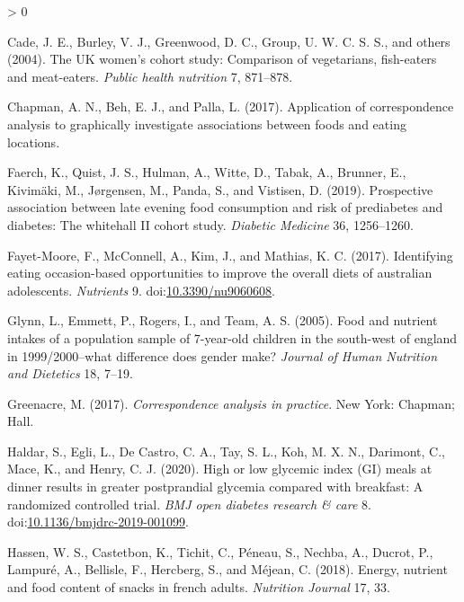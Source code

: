 \documentclass[utf8]{frontiersSCNS}
\newlength{\cslhangindent}
\newenvironment{CSLReferences}[2] %
 {%
  \setlength{\parindent}{0pt}
  \ifodd #1 \everypar{\setlength{\hangindent}{\cslhangindent}}\ignorespaces\fi
  \ifnum #2 > 0
  \setlength{\parskip}{#2\baselineskip}
  \fi
 }%
 {}
\begin{document}
\begin{CSLReferences}{1}{0}
\leavevmode\hypertarget{ref-cade2004uk}{}%
Cade, J. E., Burley, V. J., Greenwood, D. C., Group, U. W. C. S. S., and
others (2004). The UK women's cohort study: Comparison of vegetarians,
fish-eaters and meat-eaters. \emph{Public health nutrition} 7, 871--878.

\leavevmode\hypertarget{ref-Chapman2017}{}%
Chapman, A. N., Beh, E. J., and Palla, L. (2017). Application of
correspondence analysis to graphically investigate associations between
foods and eating locations.

\leavevmode\hypertarget{ref-faerch2019prospective}{}%
Faerch, K., Quist, J. S., Hulman, A., Witte, D., Tabak, A., Brunner, E.,
Kivimäki, M., Jørgensen, M., Panda, S., and Vistisen, D. (2019).
Prospective association between late evening food consumption and risk
of prediabetes and diabetes: The whitehall II cohort study.
\emph{Diabetic Medicine} 36, 1256--1260.

\leavevmode\hypertarget{ref-FayetMoore2017}{}%
Fayet-Moore, F., McConnell, A., Kim, J., and Mathias, K. C. (2017).
Identifying eating occasion-based opportunities to improve the overall
diets of australian adolescents. \emph{Nutrients} 9.
doi:\href{https://doi.org/10.3390/nu9060608}{10.3390/nu9060608}.

\leavevmode\hypertarget{ref-glynn2005food}{}%
Glynn, L., Emmett, P., Rogers, I., and Team, A. S. (2005). Food and
nutrient intakes of a population sample of 7-year-old children in the
south-west of england in 1999/2000--what difference does gender make?
\emph{Journal of Human Nutrition and Dietetics} 18, 7--19.

\leavevmode\hypertarget{ref-greenacre2017correspondence}{}%
Greenacre, M. (2017). \emph{Correspondence analysis in practice}. New
York: Chapman; Hall.

\leavevmode\hypertarget{ref-Haldar2020}{}%
Haldar, S., Egli, L., De Castro, C. A., Tay, S. L., Koh, M. X. N.,
Darimont, C., Mace, K., and Henry, C. J. (2020). High or low glycemic
index (GI) meals at dinner results in greater postprandial glycemia
compared with breakfast: A randomized controlled trial. \emph{BMJ open
diabetes research \& care} 8.
doi:\href{https://doi.org/10.1136/bmjdrc-2019-001099}{10.1136/bmjdrc-2019-001099}.

\leavevmode\hypertarget{ref-Hassen2018}{}%
Hassen, W. S., Castetbon, K., Tichit, C., Péneau, S., Nechba, A.,
Ducrot, P., Lampuré, A., Bellisle, F., Hercberg, S., and Méjean, C.
(2018). Energy, nutrient and food content of snacks in french adults.
\emph{Nutrition Journal} 17, 33.


\end{CSLReferences}
\end{document}
